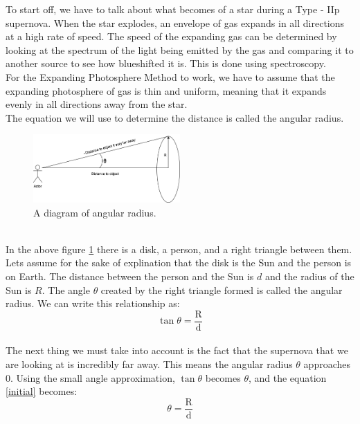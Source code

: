 To start off, we have to talk about what becomes of a star during a Type - IIp supernova.
When the star explodes, an envelope of gas expands in all directions at a high rate of speed.
The speed of the expanding gas can be determined by looking at the spectrum of the light being 
emitted by the gas and comparing it to another source to see how blueshifted it is. This is done 
using spectroscopy. 
\\
For the Expanding Photosphere Method to work, we have to assume that the expanding photosphere of gas 
is thin and uniform, meaning that it expands evenly in all directions away from the star.
\\
The equation we will use to determine the distance is called the angular radius.
\\
\begin{figure} [h!]
    \begin{center}
    \includegraphics[width=0.5\textwidth]{Angular_Radius.png}
    \end{center}
    \label{fig:angular_radius}
    \caption{A diagram of angular radius.}    
\end{figure}
\\
In the above figure \ref{fig:angular_radius} there is a disk, a person, and a right triangle between them.
Lets assume for the sake of explination that the disk is the Sun and the person is on Earth.
The distance between the person and the Sun is $d$ and the radius of the Sun is $R$.
The angle $\theta$ created by the right triangle formed is called the angular radius. 
We can write this relationship as:
\\
\begin{equation}\label{initial}
    \tan{\theta} = \frac{\textrm{R}}{\textrm{d}}
\end{equation}
\\
The next thing we must take into account is the fact that the supernova that we are looking at is incredibly far away.
This means the angular radius $\theta$ approaches 0. Using the small angle approximation, $\tan{\theta}$ becomes $\theta$, 
and the equation \ref{initial} becomes:
\\
\begin{equation}\label{eqn:after_saa}
    \theta = \frac{\textrm{R}}{\textrm{d}}
\end{equation}
